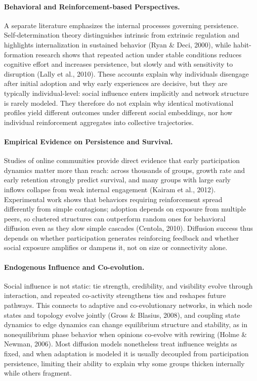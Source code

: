 \documentclass[11pt]{article}
\begin{document}
\paragraph{Behavioral and Reinforcement-based Perspectives.}
A separate literature emphasizes the internal processes governing persistence. Self-determination theory distinguishes intrinsic from extrinsic regulation and highlights internalization in sustained behavior (Ryan \& Deci, 2000), while habit-formation research shows that repeated action under stable conditions reduces cognitive effort and increases persistence, but slowly and with sensitivity to disruption (Lally et al., 2010). These accounts explain why individuals disengage after initial adoption and why early experiences are decisive, but they are typically individual-level: social influence enters implicitly and network structure is rarely modeled. They therefore do not explain why identical motivational profiles yield different outcomes under different social embeddings, nor how individual reinforcement aggregates into collective trajectories.

\paragraph{Empirical Evidence on Persistence and Survival.}
Studies of online communities provide direct evidence that early participation dynamics matter more than reach: across thousands of groups, growth rate and early retention strongly predict survival, and many groups with large early inflows collapse from weak internal engagement (Kairam et al., 2012). Experimental work shows that behaviors requiring reinforcement spread differently from simple contagions; adoption depends on exposure from multiple peers, so clustered structures can outperform random ones for behavioral diffusion even as they slow simple cascades (Centola, 2010). Diffusion success thus depends on whether participation generates reinforcing feedback and whether social exposure amplifies or dampens it, not on size or connectivity alone.

\paragraph{Endogenous Influence and Co-evolution.}
Social influence is not static: tie strength, credibility, and visibility evolve through interaction, and repeated co-activity strengthens ties and reshapes future pathways. This connects to adaptive and co-evolutionary networks, in which node states and topology evolve jointly (Gross \& Blasius, 2008), and coupling state dynamics to edge dynamics can change equilibrium structure and stability, as in nonequilibrium phase behavior when opinions co-evolve with rewiring (Holme \& Newman, 2006). Most diffusion models nonetheless treat influence weights as fixed, and when adaptation is modeled it is usually decoupled from participation persistence, limiting their ability to explain why some groups thicken internally while others fragment.
\end{document}
